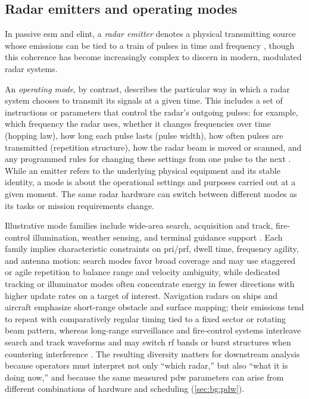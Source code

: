 \subsection{Radar emitters and operating modes}\label{sec:bg:emitters}

In passive \gls{esm} and \gls{elint}, a \emph{radar emitter} denotes a physical transmitting source whose emissions can be tied to a train of pulses in time and frequency \parencite{wiley2006elint}, though this coherence has become increasingly complex to discern in modern, modulated radar systems.

An \emph{operating mode}, by contrast, describes the particular way in which a radar system chooses to transmit its signals at a given time.
This includes a set of instructions or parameters that control the radar's outgoing pulses: for example, which frequency the radar uses, whether it changes frequencies over time (hopping law), how long each pulse lasts (pulse width), how often pulses are transmitted (repetition structure), how the radar beam is moved or scanned, and any programmed rules for changing these settings from one pulse to the next \parencite{skolnik2008radar,wiley2006elint}.
While an emitter refers to the underlying physical equipment and its stable identity, a mode is about the operational settings and purposes carried out at a given moment.
The same radar hardware can switch between different modes as its tasks or mission requirements change.


Illustrative mode families include wide-area search, acquisition and track, fire-control illumination, weather sensing, and terminal guidance support \parencite{skolnik2008radar}.
Each family implies characteristic constraints on \gls{pri}/\gls{prf}, dwell time, frequency agility, and antenna motion: search modes favor broad coverage and may use staggered or agile repetition to balance range and velocity ambiguity, while dedicated tracking or illuminator modes often concentrate energy in fewer directions with higher update rates on a target of interest.
Navigation radars on ships and aircraft emphasize short-range obstacle and surface mapping; their emissions tend to repeat with comparatively regular timing tied to a fixed sector or rotating beam pattern, whereas long-range surveillance and fire-control systems interleave search and track waveforms and may switch \gls{rf} bands or burst structures when countering interference \parencite{skolnik2008radar,wiley2006elint}.
The resulting diversity matters for downstream analysis because operators must interpret not only ``which radar,'' but also ``what it is doing now,'' and because the same measured \gls{pdw} parameters can arise from different combinations of hardware and scheduling (\cref{sec:bg:pdw}).

